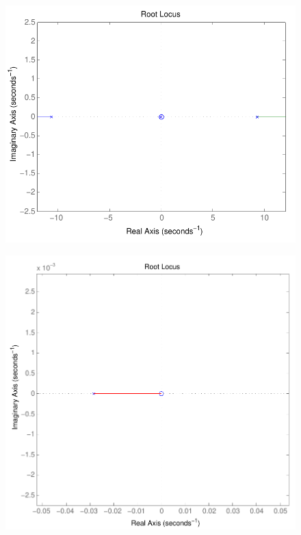 \begin{minipage}{\linewidth}
 	\begin{minipage}{0.45\linewidth}
 		\begin{figure}[H]
 			\includegraphics[scale=.56]{figures/rlocusCubli}
 			\centering
 			\vspace{-.4cm}
 			\captionsetup{justification=centering}
 			\label{rlocusCubli}
 		\end{figure}\vspace{-5mm}
 	\end{minipage}
 	\hspace{0.03\linewidth}
 	\begin{minipage}{0.45\linewidth}
 		\begin{figure}[H]
 			\includegraphics[scale=.45]{figures/rlocusCubliZoom}

\end{figure}
\end{minipage}
\end{minipage}
